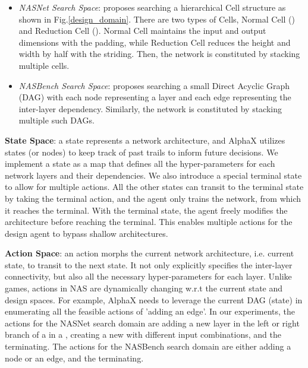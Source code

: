 \documentclass[10pt,twocolumn,letterpaper]{article}
\begin{document}
\begin{itemize}
\item \textit{NASNet Search Space}: \cite{zoph2017learning} proposes searching a hierarchical Cell structure as shown in Fig.\ref{design_domain}. There are two types of Cells, Normal Cell () and Reduction Cell (). Normal Cell maintains the input and output dimensions with the padding, while Reduction Cell reduces the height and width by half with the striding. Then, the network is constituted by stacking multiple cells. 

\item \textit{NASBench Search Space}: \cite{ying2019bench} proposes searching a small Direct Acyclic Graph (DAG) with each node representing a layer and each edge representing the inter-layer dependency. Similarly, the network is constituted by stacking multiple such DAGs. 
\end{itemize}

\label{sec:state}

\textbf{State Space}: a state represents a network architecture, and AlphaX utilizes states (or nodes) to keep track of past trails to inform future decisions. We implement a state as a map that defines all the hyper-parameters for each network layers and their dependencies. We also introduce a special terminal state to allow for multiple actions. All the other states can transit to the terminal state by taking the terminal action, and the agent only trains the network, from which it reaches the terminal. With the terminal state, the agent freely modifies the architecture before reaching the terminal. This enables multiple actions for the design agent to bypass shallow architectures.





\textbf{Action Space}: an action morphs the current network architecture, i.e. current state, to transit to the next state. It not only explicitly specifies the inter-layer connectivity, but also all the necessary hyper-parameters for each layer. Unlike games, actions in NAS are dynamically changing w.r.t the current state and design spaces. For example, AlphaX needs to leverage the current DAG (state) in enumerating all the feasible actions of 'adding an edge'. In our experiments, the actions for the NASNet search domain are adding a new layer in the left or right branch of a  in a , creating a new  with different input combinations, and the terminating. The actions for the NASBench search domain are either adding a node or an edge, and the terminating.
\end{document}
